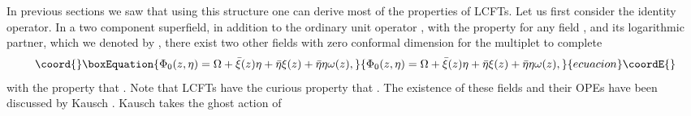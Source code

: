 \documentclass[a4paper,11pt]{article}
\begin{document}
In previous sections we saw that using this structure one can
derive most of the properties of LCFTs. Let us first consider the
identity operator. In a two component superfield, in addition to
the ordinary unit operator \myHighlight{$\Omega$}\coordHE{}, with the property \coordHE{} for any field \coordHE{}, and its logarithmic partner, which we
denoted by \myHighlight{$\omega$}\coordHE{}, there exist  two other fields with zero
conformal dimension for the multiplet to complete
\begin{equation}\coord{}\boxEquation{\label{eq:a90}
\Phi_0(z,\eta ) = \Omega  + \bar{\xi}(z) \eta +\bar{\eta}
\xi(z)+\bar{\eta} \eta \omega(z),
}{\Phi_0(z,\eta ) = \Omega  + \bar{\xi}(z) \eta +\bar{\eta}
\xi(z)+\bar{\eta} \eta \omega(z),
}{ecuacion}\coordE{}\end{equation}
with the property that \coordHE{}. Note that LCFTs have the curious property that \coordHE{}. The existence of these fields and their OPEs
have been discussed by Kausch \cite{kausch}. Kausch takes the
ghost action of
\end{document}
